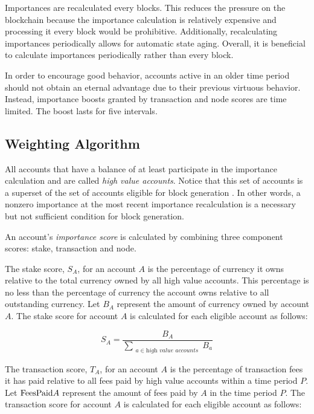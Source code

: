 Importances are recalculated every  blocks.
This reduces the pressure on the blockchain because the importance calculation is relatively expensive and processing it every block would be prohibitive.
Additionally, recalculating importances periodically allows for automatic state aging.
Overall, it is beneficial to calculate importances periodically rather than every block.

In order to encourage good behavior, accounts active in an older time period should not obtain an eternal advantage due to their previous virtuous behavior.
Instead, importance boosts granted by transaction and node scores are time limited.
The boost lasts for five  intervals.

\subsection{Weighting Algorithm}

All accounts that have a balance of at least  participate in the importance calculation and are called \emph{high value accounts}.
Notice that this set of accounts is a superset of the set of accounts eligible for block generation .
In other words, a nonzero importance at the most recent importance recalculation is a necessary but not sufficient condition for block generation.

An account's \emph{importance score} is calculated by combining three component scores: stake, transaction and node.

The stake score, $S_A$, for an account $A$ is the percentage of currency it owns relative to the total currency owned by all high value accounts.
This percentage is no less than the percentage of currency the account owns relative to all outstanding currency.
Let $B_A$ represent the amount of currency owned by account $A$.
The stake score for account $A$ is calculated for each eligible account as follows:

\begin{equation}
S_A = \frac{B_A}{\sum\limits_{\substack{a \in \textit{high value accounts}}} B_a}
\end{equation}

The transaction score, $T_A$, for an account $A$ is the percentage of transaction fees it has paid relative to all fees paid by high value accounts within a time period $P$.
Let $\mathrm{FeesPaid}{A}$ represent the amount of fees paid by $A$ in the time period $P$.
The transaction score for account $A$ is calculated for each eligible account as follows:

